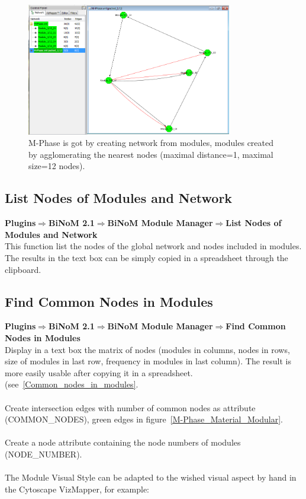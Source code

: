 \begin{figure}
\centering
\includegraphics[width=0.8\textwidth]{graphics/M-Phase_packed}
\caption{M-Phase is got by creating network from modules, modules created by agglomerating the nearest nodes (maximal distance=1, maximal size=12 nodes).}
\label{M-Phase_packed}
\end{figure}

\subsection{List Nodes of Modules and Network}
\textbf{Plugins$\Rightarrow$BiNoM 2.1$\Rightarrow$BiNoM Module Manager$\Rightarrow$List Nodes of Modules and Network}\\
This function list the nodes of the global network and nodes included in modules.\\
The results in the text box can be simply copied in a spreadsheet through the clipboard.

\subsection{Find Common Nodes in Modules}
\textbf{Plugins$\Rightarrow$BiNoM 2.1$\Rightarrow$BiNoM Module Manager$\Rightarrow$Find Common Nodes in Modules}\\
Display in a text box the matrix of nodes (modules in columns, nodes in
rows, size of modules in last row, frequency in modules in last column). The result
is more easily usable after copying it in a spreadsheet.
(see~\ref{Common_nodes_in_modules}.\\\\
Create intersection edges with number of common nodes as attribute
(COMMON\_NODES), green edges in figure~\ref{M-Phase_Material_Modular}.\\\\
Create a node attribute containing the node numbers of modules (NODE\_NUMBER).\\\\
The Module Visual Style can be adapted to the wished visual aspect by hand in
the Cytoscape VizMapper, for example:

